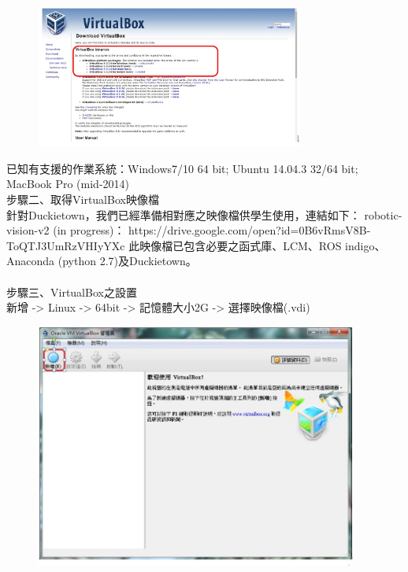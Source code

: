 \documentclass{article}
\begin{document}
\begin{figure}[htp]
    \begin{center}
        \includegraphics[width=250pt]{pic/圖片1.jpg}
    \end{center}
\end{figure}
已知有支援的作業系統：Windows7/10 64 bit; Ubuntu 14.04.3 32/64 bit; MacBook Pro (mid-2014)
\\步驟二、取得VirtualBox映像檔
\\針對Duckietown，我們已經準備相對應之映像檔供學生使用，連結如下：
robotic-vision-v2 (in progress)：
https://drive.google.com/open?id=0B6vRmsV8B-ToQTJ3UmRzVHIyYXc
此映像檔已包含必要之函式庫、LCM、ROS indigo、Anaconda (python 2.7)及Duckietown。
\\
\\步驟三、VirtualBox之設置
\\新增 -> Linux -> 64bit -> 記憶體大小2G -> 選擇映像檔(.vdi)
\begin{figure}[htp]
    \begin{center}
        \includegraphics[width=300pt]{pic/圖片2.jpg}
    \end{center}
\end{figure}
\end{document}
